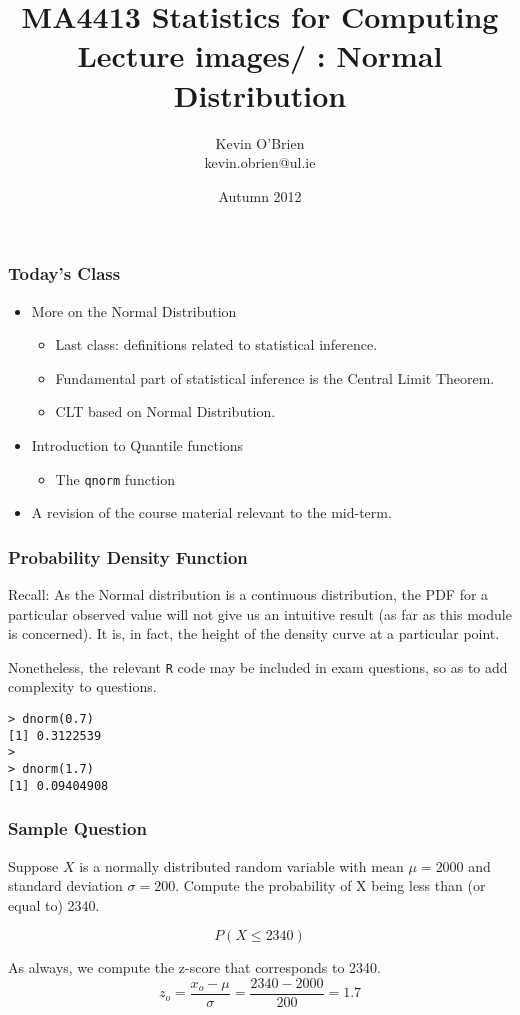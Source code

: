 \documentclass[a4]{beamer}
\title[MA4413]{MA4413 Statistics for Computing \\ {\normalsize Lecture images/ : Normal Distribution}}
\author[Kevin O'Brien]{Kevin O'Brien \\ {\scriptsize kevin.obrien@ul.ie}}
\date{Autumn 2012}
\institute[Maths \& Stats]{Dept. of Mathematics \& Statistics, \\ University \textit{of} Limerick}
\begin{document}
\begin{frame}
\titlepage
\end{frame}


\begin{frame}[fragile]
\frametitle{Today's Class}
\begin{itemize}
\item More on the Normal Distribution
\begin{itemize}
\item Last class: definitions related to statistical inference.
\item Fundamental part of statistical inference is the Central Limit Theorem.
\item CLT based on Normal Distribution.
\end{itemize}
\item Introduction to Quantile functions
\begin{itemize}
\item The \texttt{qnorm} function
\end{itemize}
\item A revision of the course material relevant to the mid-term.
\end{itemize}
\end{frame}


\begin{frame}[fragile]
\frametitle{Probability Density Function}
Recall: As the Normal distribution is a continuous distribution, the PDF for a particular observed value will not give us an intuitive
result (as far as this module is concerned). It is, in fact, the height of the density curve at a particular point.

Nonetheless, the relevant \texttt{R} code may be included in exam questions, so as to add complexity to questions.

\begin{verbatim}
> dnorm(0.7)
[1] 0.3122539
>
> dnorm(1.7)
[1] 0.09404908

\end{verbatim}
\end{frame}
\begin{frame}[fragile]
\frametitle{Sample Question}
Suppose $X$ is a normally distributed random variable with mean $\mu = 2000$ and standard deviation $\sigma=200$.
Compute the probability of X being less than (or equal to) 2340.

\[P(X \leq 2340)\]

As always, we compute the z-score that corresponds to 2340.
\[ z_o = \frac{x_o - \mu}{\sigma}  = \frac{2340-2000}{200} = 1.7\]
\end{frame}
\end{document}
